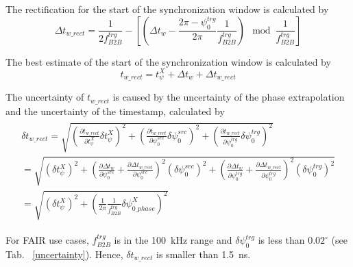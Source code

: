 The rectification for the start of the synchronization window is calculated by
\begin{equation}
\Delta t_\mathit{w\_rect}=\frac{1}{2f^\mathit{trg}_\mathit{B2B}}-[(\Delta t_\mathit{w} - \frac{2\pi-\psi^\mathit{trg}_0}{2\pi}\frac{1}{f^\mathit{trg}_\mathit{B2B}}) \mod \frac{1}{f^\mathit{trg}_\mathit{B2B}}]
\end{equation}

The best estimate of the start of the synchronization window is calculated by
\begin{equation}
t_\mathit{w\_rect}=t_\psi^\mathit{X}+\Delta t_\mathit{w}+\Delta t_\mathit{w\_rect}
\end{equation}

The uncertainty of $t_\mathit{w\_rect}$ is caused by the uncertainty of the phase extrapolation and the uncertainty of the timestamp, calculated by 
\begin{eqnarray}
\begin{aligned}
\delta t_\mathit{w\_rect} =\sqrt {(\frac {\partial t_\mathit{w\_rect}}{\partial t_\psi^\mathit{X}} \delta t_\psi^\mathit{X})^2 +(\frac {\partial t_\mathit{w\_rect}}{\partial \psi^\mathit{src}_0} \delta\psi^\mathit{src}_0)^2+(\frac {\partial t_\mathit{w\_rect}}{\partial \psi^\mathit{trg}_0} \delta\psi^\mathit{trg}_0)^2  }\\
=\sqrt {(\delta t_\psi^\mathit{X})^2 +(\frac {\partial \Delta t_\mathit{w}}{\partial \psi^\mathit{src}_0}+\frac {\partial \Delta t_\mathit{w\_rect}}{\partial \psi^\mathit{src}_0})^2 (\delta \psi^\mathit{src}_0)^2+(\frac {\partial \Delta t_\mathit{w}}{\partial \psi^\mathit{trg}_0}+\frac {\partial \Delta t_\mathit{w\_rect}}{\partial \psi^\mathit{trg}_0})^2 (\delta\psi^\mathit{trg}_0)^2 }\\
=\sqrt {(\delta t_\psi^\mathit{X})^2 + (\frac{1}{2\pi}\frac{1}{f^\mathit{trg}_\mathit{B2B}}\delta \psi^{X}_\mathit{0\_phase})^2}
\end{aligned}
\end{eqnarray}

For FAIR use cases, $f^\mathit{trg}_\mathit{B2B}$ is in the \SI{100}{kHz} range and $\delta\psi^\mathit{trg}_0$ is less than $0.02^\circ$ (see Tab. ~\ref{uncertainty}). Hence, $\delta t_\mathit{w\_rect}$ is smaller than \SI{1.5}{ns}. 

